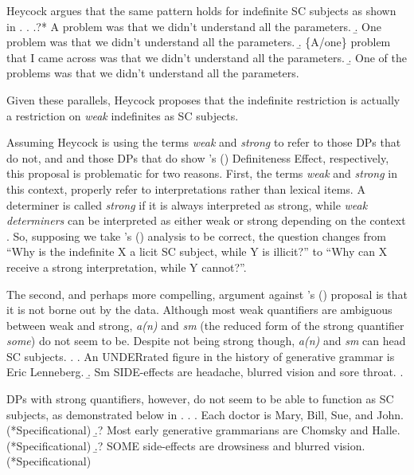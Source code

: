 \documentclass[letterpaper]{article}
\begin{document}
Heycock argues that the same pattern holds for indefinite SC subjects as shown in \Next.
\ex.
\a.?* A problem was that we didn't understand all the parameters.
\b. One problem was that we didn't understand all the parameters.
\b. \{A/one\} problem that I came across was that we didn't understand all the parameters.
\b. One of the problems was that we didn't understand all the parameters.\hfill\parencite{heycock2012specification}

Given these parallels, Heycock proposes that the indefinite restriction is actually a restriction on \textit{weak} indefinites as SC subjects.

Assuming Heycock is using the terms \textit{weak} and \textit{strong} to refer to those DPs that do not, and and those DPs that do show \citeauthor{milsark1974existential}'s (\citeyear{milsark1974existential}) Definiteness Effect, respectively, 
this proposal is problematic for two reasons.
First, the terms \textit{weak} and \textit{strong} in this context, properly refer to interpretations rather than lexical items.
A determiner is called \textit{strong} if it is always interpreted as strong, while \textit{weak determiners} can be interpreted as either weak or strong depending on the context \parencite{diesing1992indefinites}.
So, supposing we take \citeauthor{heycock2012specification}'s (\citeyear{heycock2012specification}) analysis to be correct, the question changes from ``Why is the indefinite X a licit SC subject, while Y is illicit?'' to ``Why can X receive a strong interpretation, while Y cannot?''.

The second, and perhaps more compelling, argument against \citeauthor{heycock2012specification}'s (\citeyear{heycock2012specification}) proposal is that it is not borne out by the data.
Although most weak quantifiers are ambiguous between weak and strong, \textit{a(n)} and \textit{sm} (the reduced form of the strong quantifier \textit{some}) do not seem to be.
Despite not being strong though, \textit{a(n)} and \textit{sm} can head SC subjects.
\ex.
\a. An UNDERrated figure in the history of generative grammar is Eric Lenneberg.
\b. Sm SIDE-effects are headache, blurred vision and sore throat.
\z.

DPs with strong quantifiers, however, do not seem to be able to function as SC subjects, as demonstrated below in \Next.
\ex.
\a. Each doctor is Mary, Bill, Sue, and John. (*Specificational)
\b.? Most early generative grammarians are Chomsky and Halle. (*Specificational)
\b.? SOME side-effects are drowsiness and blurred vision. (*Specificational)
\end{document}
